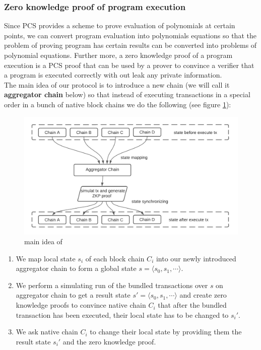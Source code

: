 \documentclass[acmtog, natbib=false]{acmart}
\begin{document}
\subsubsection{Zero knowledge proof of program execution}
Since PCS provides a scheme to prove evaluation of polynomials at certain points, we can convert program evaluation into polynomials equations so that the problem of proving program has certain results can be converted into problems of polynomial equations. Further more, a zero knowledge proof of a program execution is a PCS proof that can be used by a prover to convince a verifier that a program is executed correctly with out leak any private information.\\
\newline
The main idea of our protocol is to introduce a new chain (we will call it {\bf aggregator chain} below) so that instead of executing transactions in a special order in a bunch of native block chains we do the following (see figure \ref{main-idea}):

\begin{figure}[!ht]
\caption{main idea of \dprotocol}
\label{main-idea}
\includegraphics[scale=0.4]{main-idea}
\end{figure}
\begin{enumerate}[leftmargin=*]
\item We map local state $s_i$ of each block chain $C_i$ into our newly introduced aggregator chain to form a global state $s = \langle s_0, s_1, \cdots \rangle$.
\item We perform a simulating run of the bundled transactions over $s$ on aggregator chain to get a result state $s' = \langle s_0, s_1, \cdots \rangle$ and create zero knowledge proofs to convince native chain $C_i$ that after the bundled transaction has been executed, their local state has to be changed to $s_i'$.
\item We ask native chain $C_i$ to change their local state by providing them the result state $s_i'$ and the zero knowledge proof.
\end{enumerate}
\end{document}
